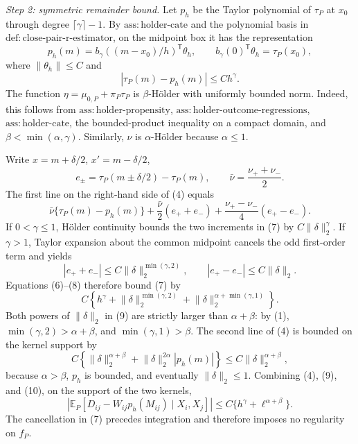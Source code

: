 \emph{Step 2: symmetric remainder bound.}
Let \(p_h\) be the Taylor polynomial of \(\tau_P\) at \(x_0\) through degree \(\lceil\gamma\rceil-1\).  By \(\mathrm{ass:holder\mbox{-}cate}\) and the polynomial basis in \(\mathrm{def:close\mbox{-}pair\mbox{-}r\mbox{-}estimator}\), on the midpoint box it has the representation
\[
p_h(m)=b_\gamma((m-x_0)/h)^{\mathsf T}\theta_h,
\qquad
b_\gamma(0)^{\mathsf T}\theta_h=\tau_P(x_0),
\tag{5}
\]
where \(\lVert\theta_h\rVert\leq C\) and
\[
|\tau_P(m)-p_h(m)|\leq Ch^\gamma.
\tag{6}
\]
The function \(\eta=\mu_{0,P}+\pi_P\tau_P\) is \(\beta\)-H\"older with uniformly bounded norm.  Indeed, this follows from \(\mathrm{ass:holder\mbox{-}propensity}\), \(\mathrm{ass:holder\mbox{-}outcome\mbox{-}regressions}\), \(\mathrm{ass:holder\mbox{-}cate}\), the bounded-product inequality on a compact domain, and \(\beta<\min(\alpha,\gamma)\).  Similarly, \(\nu\) is \(\alpha\)-H\"older because \(\alpha\leq1\).

Write \(x=m+\delta/2\), \(x'=m-\delta/2\),
\[
e_\pm=\tau_P(m\pm\delta/2)-\tau_P(m),
\qquad \bar\nu=\frac{\nu_++\nu_-}{2}.
\]
The first line on the right-hand side of (4) equals
\[
\bar\nu\{\tau_P(m)-p_h(m)\}
+\frac{\bar\nu}{2}(e_++e_-)
+\frac{\nu_+-\nu_-}{4}(e_+-e_-).
\tag{7}
\]
If \(0<\gamma\leq1\), H\"older continuity bounds the two increments in (7) by \(C\lVert\delta\rVert_2^\gamma\).  If \(\gamma>1\), Taylor expansion about the common midpoint cancels the odd first-order term and yields
\[
|e_++e_-|\leq C\lVert\delta\rVert_2^{\min(\gamma,2)},
\qquad
|e_+-e_-|\leq C\lVert\delta\rVert_2.
\tag{8}
\]
Equations (6)--(8) therefore bound (7) by
\[
C\left\{
h^\gamma+\lVert\delta\rVert_2^{\min(\gamma,2)}
+\lVert\delta\rVert_2^{\alpha+\min(\gamma,1)}
\right\}.
\tag{9}
\]
Both powers of \(\lVert\delta\rVert_2\) in (9) are strictly larger than \(\alpha+\beta\): by (1), \(\min(\gamma,2)>\alpha+\beta\), and \(\min(\gamma,1)>\beta\).  The second line of (4) is bounded on the kernel support by
\[
C\left\{
\lVert\delta\rVert_2^{\alpha+\beta}
+\lVert\delta\rVert_2^{2\alpha}|p_h(m)|
\right\}
\leq C\lVert\delta\rVert_2^{\alpha+\beta},
\tag{10}
\]
because \(\alpha>\beta\), \(p_h\) is bounded, and eventually \(\lVert\delta\rVert_2\leq1\).  Combining (4), (9), and (10), on the support of the two kernels,
\[
\left|\mathbb E_P[D_{ij}-W_{ij}p_h(M_{ij})\mid X_i,X_j]\right|
\leq C\{h^\gamma+\ell^{\alpha+\beta}\}.
\tag{11}
\]
The cancellation in (7) precedes integration and therefore imposes no regularity on \(f_P\).

